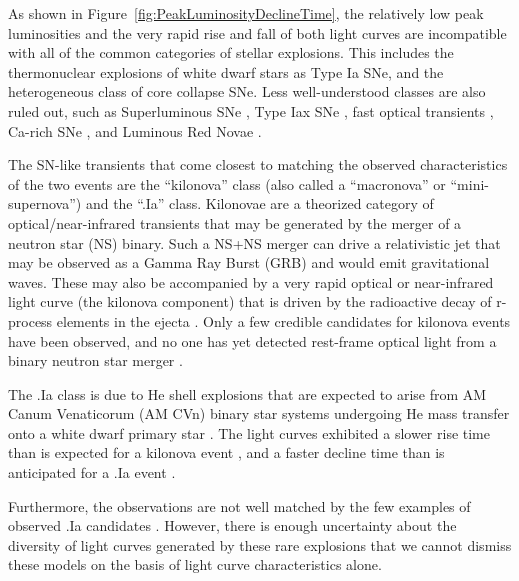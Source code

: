 As shown in Figure~\ref{fig:PeakLuminosityDeclineTime}, the relatively
low peak luminosities and the very rapid rise and fall of both \spock
light curves are incompatible with all of the common categories of
stellar explosions. This includes the thermonuclear explosions of
white dwarf stars as Type Ia SNe, and the heterogeneous class of
core collapse SNe.  Less well-understood classes are also
ruled out, such as Superluminous SNe \citep{Gal-Yam:2012,Arcavi:2016},
Type Iax SNe \citep{Li:2003,Jha:2006a,Foley:2013a}, fast optical transients
\citep{Drout:2014}, Ca-rich SNe
\citep{Filippenko:2003,Perets:2011,Kasliwal:2012}, and Luminous Red
Novae \citep[also called intermediate luminosity red
  transients;][]{Munari:2002,Kulkarni:2007,Kasliwal:2011b}.

The SN-like transients that come closest to matching the observed
characteristics of the two \spock events are the ``kilonova'' class
(also called a ``macronova'' or ``mini-supernova'') and the ``.Ia''
class.  Kilonovae are a theorized category of optical/near-infrared
transients that may be generated by the merger of a neutron star (NS)
binary. Such a NS+NS merger can drive a relativistic jet that may be
observed as a Gamma Ray Burst (GRB) and would emit gravitational
waves.  These may also be accompanied by a very rapid optical or
near-infrared light curve (the kilonova component) that is driven by
the radioactive decay of r-process elements in the ejecta
\citep{Li:1998,Kulkarni:2005}.  Only a few credible candidates for
kilonova events have been observed, and no one has yet detected
rest-frame optical light from a binary neutron star merger
\citep{Perley:2009,Tanvir:2013}.

The .Ia class is due to He shell explosions that are expected to arise
from AM Canum Venaticorum (AM CVn) binary star systems undergoing He
mass transfer onto a white dwarf primary star \citep{Warner:1995,
  Nelemans:2005,Bildsten:2007}.  The \spock light curves exhibited a
slower rise time than is expected for a kilonova event
\citep[e.g.,][]{Metzger:2010,Barnes:2013,Kasen:2015}, and a faster
decline time than is anticipated for a .Ia event
\citep[e.g.,][]{Shen:2010}.

Furthermore, the \spock observations are not
well matched by the few examples of observed .Ia candidates
\citep{Kasliwal:2010, Perets:2010, Poznanski:2010}.  However, there is
enough uncertainty about the diversity of light curves generated by
these rare explosions that we cannot dismiss these models on the
basis of light curve characteristics alone.

